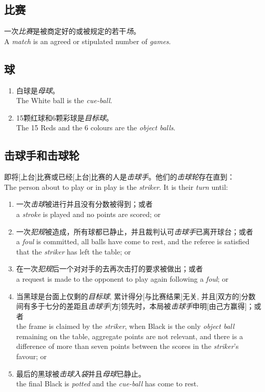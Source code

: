 \subsection{比赛}

\noindent 一次\textit{比赛}是被商定好的或被规定的若干\textit{场}。\\
A \textit{match} is an agreed or stipulated number of \textit{games}.

\subsection{球}

\begin{enumerate}[label=(\alph*)]
    \item 白球是\textit{母球}。\\
    The White ball is the \textit{cue-ball}.
    \item 15颗红球和6颗彩球是\textit{目标球}。\\
    The 15 Reds and the 6 colours are the \textit{object balls}.
\end{enumerate}

\subsection{击球手和击球轮}

\noindent 即将[上台]比赛或已经[上台]比赛的人是\textit{击球手}。他们的\textit{击球轮}存在直到：\\
The person about to play or in play is the \textit{striker}. It is their \textit{turn} until:
\begin{enumerate}[label=(\alph*)]
    \item 一次\textit{击球}被进行并且没有分数被得到；或者\\
    a \textit{stroke} is played and no points are scored; or
    \item 一次\textit{犯规}被造成，所有球都已静止，并且裁判认可\textit{击球手}已离开球台；或者\\
    a \textit{foul} is committed, all balls have come to rest, and the referee is satisfied that the \textit{striker} has left the table; or
    \item 在一次\textit{犯规}后一个对对手的去再次击打的要求被做出；或者\\
    a request is made to the opponent to play again following a \textit{foul}; or
    \item 当黑球是台面上仅剩的\textit{目标球}, 累计得分[与比赛结果]无关, 并且[双方的]分数间有多于七分的差距且\textit{击球手}[方]领先时，本局被\textit{击球手}申明[由己方赢得]；或者\\
    the frame is claimed by the \textit{striker}, when Black is the only \textit{object ball} remaining on the table, aggregate points are not relevant, and there is a difference of more than seven points between the scores in the \textit{striker}'s favour; or
    \item 最后的黑球被\textit{击球入袋}并且\textit{母球}已静止。\\
    the final Black is \textit{potted} and the \textit{cue-ball} has come to rest.
\end{enumerate}

